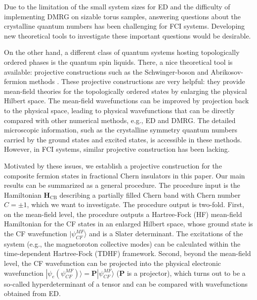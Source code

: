 Due to the limitation of the small system sizes for ED and the difficulty of implementing DMRG on sizable torus samples, answering questions about the crystalline quantum numbers has been challenging for FCI systems. Developing new theoretical tools to investigate these important questions would be desirable. 

On the other hand, a different class of quantum systems hosting topologically ordered phases is the quantum spin liquids. There, a nice theoretical tool is available: projective constructions such as the Schwinger-boson and Abrikosov-fermion methods \cite{arovas1988functional,read1991large,sachdev1991large,sachdev1992kagome,wang2010schwinger,wen1991mean,wen2002quantum,gros1989physics,tay2011variational}. These projective constructions are very helpful: they provide mean-field theories for the topologically ordered states by enlarging the physical Hilbert space. The mean-field wavefunctions can be improved by projection back to the physical space, leading to physical wavefunctions that can be directly compared with other numerical methods, e.g., ED and DMRG. The detailed microscopic information, such as the crystalline symmetry quantum numbers carried by the ground states and excited states, is accessible in these methods. However, in FCI systems, similar projective construction has been lacking. 

Motivated by these issues, we establish a projective construction for the composite fermion states in fractional Chern insulators in this paper. Our main results can be summarized as a general procedure. The procedure input is the Hamiltonian $\mathbf H_{\text{CB}}$ describing a partially filled Chern band with Chern number $C=\pm 1$, which we want to investigate. The procedure output is two-fold. First, on the mean-field level, the procedure outputs a Hartree-Fock (HF) mean-field Hamiltonian for the CF states in an enlarged Hilbert space, whose ground state is the CF wavefunction $|\psi^{MF}_{CF}\rangle$ and is a Slater determinant. The excitations of the system (e.g., the magnetoroton collective modes) can be calculated within the time-dependent Hartree-Fock (TDHF) framework. Second, beyond the mean-field level, the CF wavefunction can be projected into the physical electronic wavefunction $|\psi_{e}(\psi^{MF}_{CF})\rangle=\mathbf P |\psi^{MF}_{CF}\rangle$ ($\mathbf P$ is a projector), which turns out to be a so-called hyperdeterminant of a tensor and can be compared with wavefunctions obtained from ED. 

